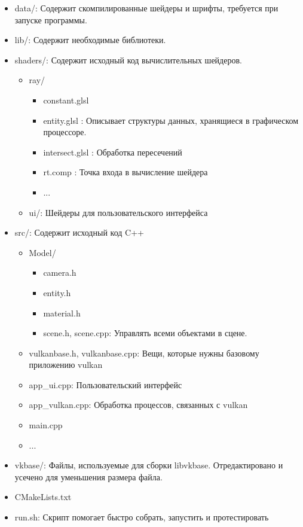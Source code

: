 \begin{itemize}
    \item data/: Содержит скомпилированные шейдеры и шрифты, требуется при запуске программы.
    \item lib/: Содержит необходимые библиотеки.
    \item shaders/: Содержит исходный код вычислительных шейдеров.
    \begin{itemize}
        \item ray/
        \begin{itemize}
            \item constant.glsl
            \item entity.glsl : Описывает структуры данных, хранящиеся в графическом процессоре.
            \item intersect.glsl : Обработка пересечений
            \item rt.comp : Точка входа в вычисление шейдера
            \item ...
        \end{itemize}
        \item ui/: Шейдеры для пользовательского интерфейса
    \end{itemize}
    \item src/: Содержит исходный код C++
    \begin{itemize}
        \item Model/
        \begin{itemize}
            \item camera.h
            \item entity.h
            \item material.h
            \item scene.h, scene.cpp: Управлять всеми объектами в сцене.
        \end{itemize}
        \item vulkanbase.h, vulkanbase.cpp: Вещи, которые нужны базовому приложению vulkan
        \item app\_ui.cpp: Пользовательский интерфейс
        \item app\_vulkan.cpp: Обработка процессов, связанных с vulkan
        \item main.cpp
        \item ...
    \end{itemize}
    \item vkbase/: Файлы, используемые для сборки libvkbase. Отредактировано и усечено для уменьшения размера файла.
    \item CMakeLists.txt
    \item run.sh: Скрипт помогает быстро собрать, запустить и протестировать
\end{itemize}

